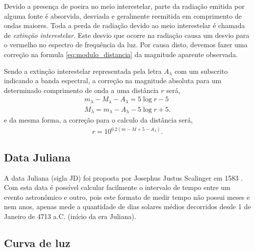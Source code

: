 Devido a presença de poeira no meio interestelar, parte da radiação emitida por alguma fonte é absorvida, desviada e geralmente reemitida em comprimento de ondas maiores. Toda a perda de radiação devido ao meio interestelar é chamada de \textit{extinção interestelar}. Este desvio que ocorre na radiação causa um desvio para o vermelho no espectro de frequência da luz. Por causa disto, devemos fazer uma correção na formula \eqref{eq:modulo_distancia} da magnitude aparente observada.

Sendo a extinção interestelar representada pela letra $A_{\lambda}$ com um subscrito indicando a banda espectral, a correção na magnitude absoluta para um determinado comprimento de onda a uma distância $r$ será,
\begin{align}
m_{\lambda} - M_{\lambda} - A_{\lambda} = 5 \log r - 5 \\
M_{\lambda} = m_{\lambda} - A_{\lambda} - 5 \log r + 5.
\end{align}
e da mesma forma, a correção para o calculo da distância será,
\begin{align}
r = 10^{0.2 \left(m -M + 5 - A_{\lambda} \right)}. \label{eq:dist_ext}
\end{align}



\subsection{Data Juliana}

A data Juliana (sigla JD) foi proposta por Josephus Justus Scalinger em 1583 \citep{keplerLivro2013}. Com esta data é possível calcular facilmente o intervalo de tempo entre um evento astronômico e outro, pois este formato de medir tempo não possui meses e nem anos, apenas mede a quantidade de dias solares médios decorridos desde 1 de Janeiro de 4713 a.C. (início da era Juliana).


\subsection{Curva de luz}


